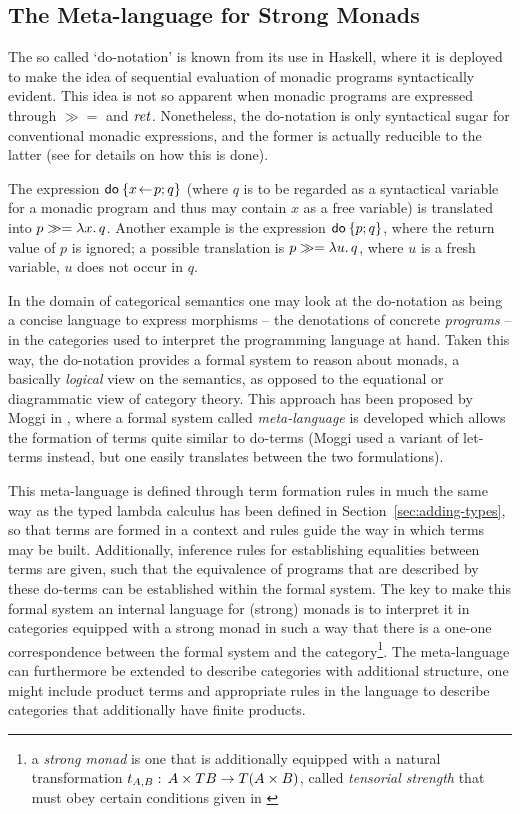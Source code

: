 \subsection{The Meta-language for Strong Monads}
\label{sec:metalanguage-monads}

The so called `do-notation' is known from its use in Haskell, where it is
deployed to make the idea of sequential evaluation of monadic programs
syntactically evident. This idea is not so apparent when monadic programs are
expressed through $\gg=$ and $\mathit{ret}$.  Nonetheless, the do-notation is only
syntactical sugar for conventional monadic expressions, and the former is
actually reducible to the latter (see \cite{Haskell98} for details on how this
is done).
\begin{expl}
  The expression $\mathsf{do}\: \{x\!\gets\! p; q\}$ (where $q$ is to be regarded as a
  syntactical variable for a monadic program and thus may contain $x$ as a free
  variable) is translated into $p \gg= {\lambda x.\,q}$. Another example is the expression
  $\mathsf{do}\: \{p; q\}$, where the return value of $p$ is ignored; a possible
  translation is $p \gg= {\lambda u.\,q}$, where $u$ is a fresh variable, \IE $u$
  does not occur in $q$.
\end{expl}

In the domain of categorical semantics one may look at the do-notation as being
a concise language to express morphisms -- \IE the denotations of concrete
\emph{programs} -- in the categories used to interpret the programming language
at hand.  Taken this way, the do-notation provides a formal system to reason
about monads, \IE a basically \emph{logical} view on the semantics, as opposed
to the equational or diagrammatic view of category theory. This approach has
been proposed by Moggi in \cite{Moggi91}, where a formal system called
\emph{meta-language} is developed which allows the formation of terms quite
similar to do-terms (Moggi used a variant of let-terms instead, but one easily
translates between the two formulations).  

This meta-language is defined through term formation rules in much the same way
as the typed lambda calculus has been defined in Section~\ref{sec:adding-types},
so that terms are formed in a context and rules guide the way in which terms may
be built.  Additionally, inference rules for establishing equalities between
terms are given, such that the equivalence of programs that are described by
these do-terms can be established within the formal system. The key to make this
formal system an internal language for (strong) monads is to interpret it in
categories equipped with a strong monad in such a way that there is a one-one
correspondence between the formal system and the category\footnote{a
  \emph{strong monad} is one that is additionally equipped with a natural
  transformation $t_{A,B} :\, A \times T B \to T (A\times B)$, called \emph{tensorial
    strength} that must obey certain conditions given in \cite{Moggi91}}.  The
meta-language can furthermore be extended to describe categories with additional
structure, \EG one might include product terms and appropriate rules in the
language to describe categories that additionally have finite products.

